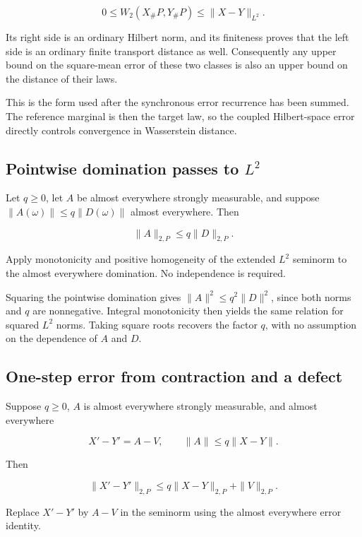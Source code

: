 \documentclass[11pt,a4paper]{article}
\begin{document}
\[0\le W_2(X_\#P,Y_\#P)\le\|X-Y\|_{L^2}.\]


Its right side is an ordinary Hilbert norm, and its finiteness proves that the left side is an ordinary finite transport distance as well. Consequently any upper bound on the square-mean error of these two classes is also an upper bound on the distance of their laws.



This is the form used after the synchronous error recurrence has been summed. The reference marginal is then the target law, so the coupled Hilbert-space error directly controls convergence in Wasserstein distance.


\subsection{\texorpdfstring{Pointwise domination passes to \(L^2\)}{Pointwise domination passes to L²}}


Let \(q\ge0\), let \(A\) be almost everywhere strongly measurable, and suppose \(\|A(\omega)\|\le q\|D(\omega)\|\) almost everywhere. Then

\[\|A\|_{2,P}\le q\|D\|_{2,P}.\]

Apply monotonicity and positive homogeneity of the extended \(L^2\) seminorm to the almost everywhere domination. No independence is required.



Squaring the pointwise domination gives \(\|A\|^2\le q^2\|D\|^2\), since both norms and \(q\) are nonnegative. Integral monotonicity then yields the same relation for squared \(L^2\) norms. Taking square roots recovers the factor \(q\), with no assumption on the dependence of \(A\) and \(D\).


\subsection{\texorpdfstring{One-step error from contraction and a defect}{One-step error from contraction and a defect}}


Suppose \(q\ge0\), \(A\) is almost everywhere strongly measurable, and almost everywhere

\[X'-Y'=A-V,\qquad\|A\|\le q\|X-Y\|.\]

Then

\[\|X'-Y'\|_{2,P}\le q\|X-Y\|_{2,P}+\|V\|_{2,P}.\]

Replace \(X'-Y'\) by \(A-V\) in the seminorm using the almost everywhere error identity.
\end{document}
